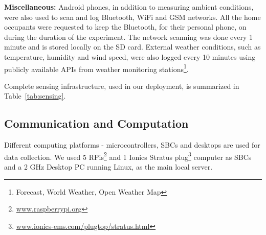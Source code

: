 \documentclass[10pt]{sensys-proc}
\newcommand{\secref}[1]{Section~\ref{#1}}
\newcommand{\tabref}[1]{Table~\ref{#1}}
\begin{document}
\noindent \textbf{Miscellaneous:} Android phones, in addition to measuring ambient conditions, were also used to scan and log Bluetooth, WiFi and GSM networks. All the home occupants were requested to keep the Bluetooth, for their personal phone, on during the duration of the experiment. The network scanning was done every 1 minute and is stored locally on the SD card. External weather conditions, such as temperature, humidity and wind speed, were also logged every 10 minutes using publicly available APIs from weather monitoring stations\footnote{Forecast, World Weather, Open Weather Map}.


Complete sensing infrastructure, used in our deployment, is summarized in \tabref{tab:sensing}.

\vspace{-1mm}
\subsection{Communication and Computation}
\label{sec:comm_comp}
Different computing platforms - microcontrollers, SBCs and desktops are used for data collection.  
We used 5 RPis\footnote{\url{www.raspberrypi.org}} and 1 Ionics Stratus plug\footnote{\url{www.ionics-ems.com/plugtop/stratus.html}} computer as SBCs and a 2 GHz Desktop PC running Linux, as the main local server.
\end{document}
